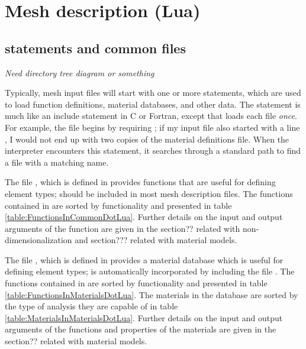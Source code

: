 \newpage
\section{Mesh description (Lua)}
\subsection{ statements and common files}
\label{require-section}
\emph{Need directory tree diagram or something}

Typically, mesh input files will start with one or more 
statements, which are used to load function definitions, material
databases, and other data.  The  statement is much
like an include statement in C or Fortran, except that
 loads each file \emph{once}.  For example, the file
 begins by requiring ; if my
input file also started with a line ,
I would not end up with two copies of the material definitions file.
When the interpreter encounters this  statement, it
searches through a standard path to find a file with a matching name.

The file , which is
defined in  provides functions that are
useful for defining element types;  should be
included in most mesh description files. The 
functions contained in  are sorted by functionality
and presented in table \ref{table:FunctionsInCommonDotLua}. Further
details on the input and output arguments of the function are 
given in the section?? related with non-dimensionalization and 
section??? related with material models.

The file , which is
defined in  provides a material database
which is useful for defining element types;  is
automatically incorporated by including the file . The 
functions contained in  are sorted by functionality
and presented in table \ref{table:FunctionsInMaterialsDotLua}. 
The materials in the database are sorted by the type of analysis they
are capable of in table \ref{table:MaterialsInMaterialsDotLua}.
Further details on the input and output arguments of the functions and
properties of the materials are 
given in the section?? related with material models.


